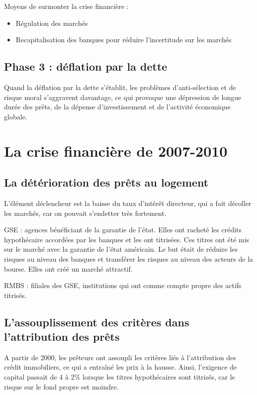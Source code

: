 	Moyens de surmonter la crise financière :
	\begin{itemize}
		\item Régulation des marchés
		\item Recapitalisation des banques pour réduire l'incertitude sur les marchés
	\end{itemize}

	\subsection{Phase 3 : déflation par la dette}
	
	Quand la déflation par la dette s'établit, les problèmes d'anti-sélection et de risque moral s'aggravent davantage, ce qui provoque une dépression de longue durée des prêts, de la dépense d'investissement et de l'activité économique globale. 


\section{La crise financière de 2007-2010}

	\subsection{La détérioration des prêts au logement}
	
	L'élément déclencheur est la baisse du taux d'intérêt directeur, qui a fait décoller les marchés, car on pouvait s'endetter très fortement.
	
	GSE : agences bénéficiant de la garantie de l'état. Elles ont racheté les crédits hypothécaire accordées par les banques et les ont titrisées. Ces titres ont été mis sur le marché avec la garantie de l'état américain. Le but était de réduire les risques au niveau des banques et transférer les risques au niveau des acteurs de la bourse. Elles ont créé un marché attractif.
	
	RMBS : filiales des GSE, institutions qui ont comme compte propre des actifs titrisés.
	
	\subsection{L'assouplissement des critères dans l'attribution des prêts}
	
	A partir de 2000, les prêteurs ont assoupli les critères liés à l'attribution des crédit immobiliers, ce qui a entraîné les prix à la hausse. Ainsi, l'exigence de capital passait de 4 à 2\% lorsque les titres hypothécaires sont titrisés, car le risque sur le fond propre est moindre.

